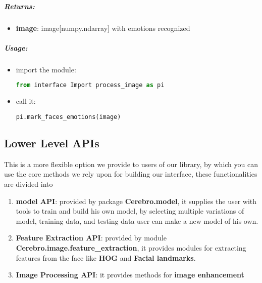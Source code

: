 \subparagraph{Returns:}
\begin{changemargin}{0.5cm}{0cm}
\begin{itemize}
	\item \textbf{image}:\newline
	image[numpy.ndarray] with emotions recognized 
\end{itemize}
\end{changemargin}

\subparagraph{Usage:}
\begin{changemargin}{0.5cm}{0cm}
\begin{itemize}
	\item import the module:
	\begin{lstlisting}[language=Python]
	from interface Import process_image as pi\end{lstlisting}
	
	\item call it:
	\begin{lstlisting}[language=Python]
	pi.mark_faces_emotions(image)\end{lstlisting}
\end{itemize}
\end{changemargin}

\subsection{Lower Level APIs}
This is a more flexible option we provide to users of our library, by which you can use the core methods we rely upon for building our interface, these functionalities are divided into
\begin{enumerate}
	\item \textbf{model API}: provided by package \textbf{Cerebro.model}, it supplies the user with tools to train and build his own model, by selecting multiple variations of model, training data, and testing data user can make a new model of his own. 
	\item \textbf{Feature Extraction API}: provided by module \textbf{Cerebro.image.feature\_extraction}, it provides modules for extracting features from the face like \textbf{HOG} and \textbf{Facial landmarks}.
	\item \textbf{Image Processing API}: it provides methods for \textbf{image enhancement}
\end{enumerate}


